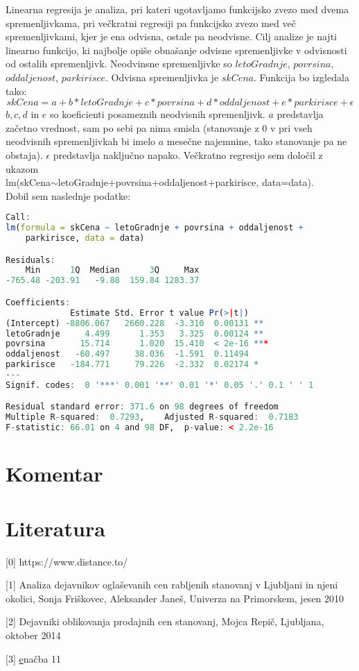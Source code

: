 \documentclass[a4paper, 12pt]{article}
\begin{document}
Linearna regresija je analiza, pri kateri ugotavljamo funkcijsko zvezo med
dvema spremenljivkama, pri večkratni regresiji pa funkcijsko zvezo med več
spremenljivkami, kjer je ena odvisna, ostale pa neodvisne. Cilj analize je
najti linearno funkcijo, ki najbolje opiše obnašanje odvisne spremenljivke v
odvisnosti od ostalih spremenljivk.
\newline
Neodvinsne spremenljivke so $ letoGradnje $, $ povrsina $,
$ oddaljenost $, $ parkirisce $. Odvisna spremenljivka je
$ skCena $. Funkcija bo izgledala tako:
\begin{equation}
	skCena = a+b*letoGradnje+c*povrsina+d*oddaljenost+e*parkirisce+\epsilon
\end{equation}
$ b, c, d $ in $ e $ so koeficienti posameznih neodvisnih spremenljivk. $ a $
predstavlja začetno vrednost, sam po sebi pa nima smisla (stanovanje z $ 0 $ v
pri vseh neodvisnih spremenljivkah bi imelo $ a $ mesečne najemnine, tako
stanovanje pa ne obstaja). $ \epsilon $ predstavlja naključno napako.
\newline
Večkratno regresijo sem določil z ukazom \\
{\sf lm(skCena$\sim$letoGradnje+povrsina+oddaljenost+parkirisce, data=data)}. \\
Dobil sem naslednje podatke:
\begin{lstlisting}[language=R,basicstyle=\small]
Call:
lm(formula = skCena ~ letoGradnje + povrsina + oddaljenost + 
    parkirisce, data = data)

Residuals:
    Min      1Q  Median      3Q     Max 
-765.48 -203.91   -9.88  159.84 1283.37 

Coefficients:
             Estimate Std. Error t value Pr(>|t|)    
(Intercept) -8806.067   2660.228  -3.310  0.00131 ** 
letoGradnje     4.499      1.353   3.325  0.00124 ** 
povrsina       15.714      1.020  15.410  < 2e-16 ***
oddaljenost   -60.497     38.036  -1.591  0.11494    
parkirisce   -184.771     79.226  -2.332  0.02174 *  
---
Signif. codes:  0 '***' 0.001 '**' 0.01 '*' 0.05 '.' 0.1 ' ' 1

Residual standard error: 371.6 on 98 degrees of freedom
Multiple R-squared:  0.7293,	Adjusted R-squared:  0.7183 
F-statistic: 66.01 on 4 and 98 DF,  p-value: < 2.2e-16
\end{lstlisting}


\section{Komentar}

\section{Literatura}

[0]
https://www.distance.to/

[1] Analiza dejavnikov oglaševanih cen rabljenih stanovanj v Ljubljani in njeni
okolici, Sonja Friškovec, Aleksander Janeš, Univerza na Primorskem, jesen 2010

[2] Dejavniki oblikovanja prodajnih cen stanovanj, Mojca Repič, Ljubljana,
oktober 2014

[3] \href{https://www.researchgate.net/publication/239329925_A_New_Test_of_Symmetry_about_an_Unknown_Median}
enačba 11
\end{document}
